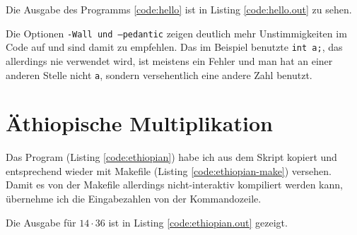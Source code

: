 \documentclass[12pt]{report}
\begin{document}


Die Ausgabe des Programms \ref{code:hello} ist in Listing \ref{code:hello.out} zu sehen.



Die Optionen \texttt{-Wall und --pedantic} zeigen deutlich mehr Unstimmigkeiten im Code auf und sind damit zu empfehlen. Das im Beispiel benutzte \texttt{int a;}, das allerdings nie verwendet wird, ist meistens ein Fehler und man hat an einer anderen Stelle nicht \texttt{a}, sondern versehentlich eine andere Zahl benutzt.

\section{Äthiopische Multiplikation}

Das Program (Listing \ref{code:ethiopian}) habe ich aus dem Skript kopiert und entsprechend wieder mit Makefile (Listing \ref{code:ethiopian-make}) versehen. Damit es von der Makefile allerdings nicht-interaktiv kompiliert werden kann, übernehme ich die Eingabezahlen von der Kommandozeile.




Die Ausgabe für $14 \cdot 36$ ist in Listing \ref{code:ethiopian.out} gezeigt.



\end{document}
